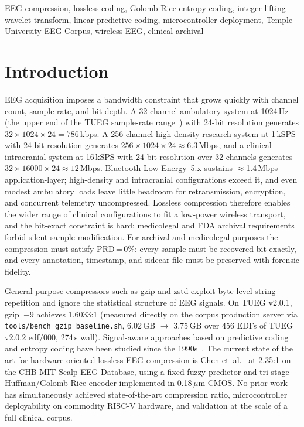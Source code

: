 \documentclass[journal]{IEEEtran}
\begin{document}
\begin{IEEEkeywords}
EEG compression, lossless coding, Golomb-Rice entropy coding,
integer lifting wavelet transform, linear predictive coding,
microcontroller deployment, Temple University EEG Corpus,
wireless EEG, clinical archival
\end{IEEEkeywords}

\IEEEpeerreviewmaketitle

\section{Introduction}
\label{sec:introduction}

 EEG acquisition imposes a bandwidth
constraint that grows quickly with channel count, sample rate,
and bit depth. A 32-channel ambulatory system at 1024\,Hz
(the upper end of the TUEG sample-rate range~\cite{tueg_aareadme_v201})
with 24-bit resolution generates $32 \times 1024 \times 24 =
786$\,kbps. A 256-channel high-density research system at
1\,kSPS with 24-bit resolution generates $256 \times 1024 \times
24 \approx 6.3$\,Mbps, and a clinical intracranial system at
16\,kSPS with 24-bit resolution over 32 channels generates
$32 \times 16000 \times 24 \approx 12$\,Mbps. Bluetooth Low Energy~5.x sustains
$\approx$1.4\,Mbps application-layer; high-density and intracranial
configurations exceed it, and even modest ambulatory loads leave
little headroom for retransmission, encryption, and concurrent
telemetry uncompressed.
Lossless compression therefore enables the wider range of
clinical configurations to fit a low-power wireless transport,
and the bit-exact constraint is hard: medicolegal and FDA archival
requirements forbid silent sample modification. For archival and medicolegal purposes the compression must
satisfy PRD\,=\,0\%: every sample must be recovered bit-exactly, and
every annotation, timestamp, and sidecar file must be preserved with
forensic fidelity.

General-purpose compressors such as gzip and zstd exploit
byte-level string repetition and ignore the statistical structure
of EEG signals. On TUEG v2.0.1, gzip~$-9$ achieves 1.6033:1
(measured directly on the corpus production server via
\texttt{tools/bench\_gzip\_baseline.sh}, 6.02\,GB $\rightarrow$
3.75\,GB over 456 EDFs of TUEG v2.0.2 edf/000, 274\,s wall).
Signal-aware approaches based on predictive coding and entropy
coding have been studied since the 1990s~\cite{memon1998}. The
current state of the art for hardware-oriented lossless EEG
compression is Chen et~al.~\cite{chen2018vlsi} at 2.35:1 on the
CHB-MIT Scalp EEG Database, using a fixed fuzzy predictor and
tri-stage Huffman/Golomb-Rice encoder implemented in
0.18\,$\mu$m CMOS. No prior work has simultaneously achieved
state-of-the-art compression ratio, microcontroller deployability
on commodity RISC-V hardware, and validation at the scale of a
full clinical corpus.
\end{document}
